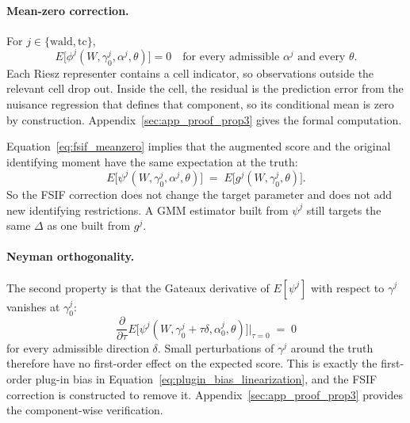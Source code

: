 \paragraph{Mean-zero correction.} For $j \in \{\text{wald},\text{tc}\}$,
\begin{equation}\label{eq:fsif_meanzero}
    E\bigl[\phi^j(W,\gamma^j_0,\alpha^j,\theta)\bigr] = 0
    \quad \text{for every admissible $\alpha^j$ and every $\theta$.}
\end{equation}
Each Riesz representer contains a cell indicator, so observations outside the relevant cell drop out. Inside the cell, the residual is the prediction error from the nuisance regression that defines that component, so its conditional mean is zero by construction. Appendix~\ref{sec:app_proof_prop3} gives the formal computation.

Equation~\eqref{eq:fsif_meanzero} implies that the augmented score and the original identifying moment have the same expectation at the truth:
\begin{equation}\label{eq:psi_eq_g}
    E\bigl[\psi^j(W,\gamma^j_0,\alpha^j,\theta)\bigr]
    \;=\;
    E\bigl[g^j(W,\gamma^j_0,\theta)\bigr].
\end{equation}
So the FSIF correction does not change the target parameter and does not add new identifying restrictions. A GMM estimator built from $\psi^j$ still targets the same $\Delta$ as one built from $g^j$.

\paragraph{Neyman orthogonality.} The second property is that the Gateaux derivative of $E[\psi^j]$ with respect to $\gamma^j$ vanishes at $\gamma^j_0$:
\begin{equation}\label{eq:neyman_orth}
    \frac{\partial}{\partial \tau}
    E\bigl[\psi^j(W,\gamma^j_0 + \tau\delta,\alpha^j_0,\theta)\bigr]
    \bigg|_{\tau=0}
    \;=\; 0
\end{equation}
for every admissible direction $\delta$. Small perturbations of $\gamma^j$ around the truth therefore have no first-order effect on the expected score. This is exactly the first-order plug-in bias in Equation~\eqref{eq:plugin_bias_linearization}, and the FSIF correction is constructed to remove it. Appendix~\ref{sec:app_proof_prop3} provides the component-wise verification.

